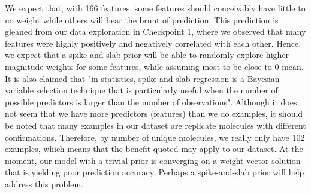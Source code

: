 \documentclass[12pt]{article}
\begin{document}
We expect that, with 166 features, some features should conceivably have little to no weight while others will bear the brunt of prediction. This prediction is gleaned from our data exploration in Checkpoint 1, where we observed that many features were highly positively and negatively correlated with each other. Hence, we expect that a spike-and-slab prior will be able to randomly explore higher magnitude weights for some features, while assuming most to be close to 0 mean. It is also claimed that "in statistics, spike-and-slab regression is a Bayesian variable selection technique that is particularly useful when the number of possible predictors is larger than the number of observations". Although it does not seem that we have more predictors (features) than we do examples, it should be noted that many examples in our dataset are replicate molecules with different confirmations. Therefore, by number of unique molecules, we really only have 102 examples, which means that the benefit quoted may apply to our dataset. At the moment, our model with a trivial prior is converging on a weight vector solution that is yielding poor prediction accuracy. Perhaps a spike-and-slab prior will help address this problem.
\end{document}
